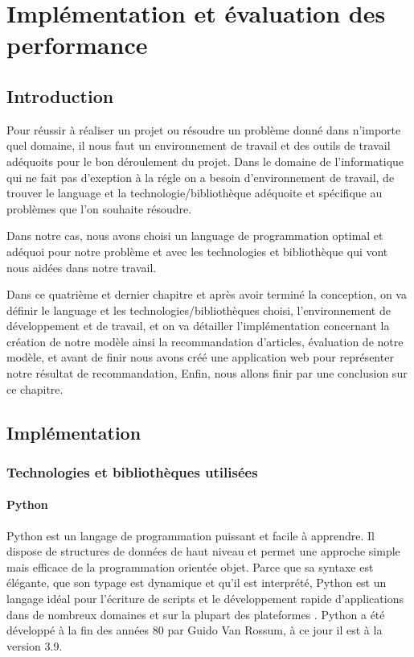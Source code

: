 \chapter{\textbf{Implémentation et évaluation des performance}}\label{chapitre4}

\section{Introduction}
\par Pour réussir à réaliser un projet ou résoudre un problème donné dans n'importe quel domaine, il nous faut un environnement de travail et des outils de travail adéquoits pour le bon déroulement du projet. Dans le domaine de l'informatique qui ne fait pas d'exeption à la régle on a besoin d'environnement  de travail, de trouver le language et la technologie/bibliothèque adéquoite et spécifique au problèmes que l'on souhaite résoudre. 

\par Dans notre cas, nous avons choisi un language de programmation optimal et adéquoi pour notre problème et avec les technologies et bibliothèque qui vont nous aidées dans notre travail.

\par Dans ce quatrième et dernier chapitre et après avoir terminé la conception, on va définir le language et les technologies/bibliothèques choisi, l'environnement de développement et de travail, et on va détailler l'implémentation concernant la création de notre modèle ainsi la recommandation d'articles, évaluation de notre modèle, et avant de finir nous avons créé une application web pour représenter notre résultat de recommandation, Enfin, nous allons finir par une conclusion sur ce chapitre.

\section{Implémentation}
\par 
    \subsection{Technologies et bibliothèques utilisées}
    \par
    
        \subsubsection{Python}
        \par Python est un langage de programmation puissant et facile à apprendre. Il dispose de structures de données de haut niveau et permet une approche simple mais efficace de la programmation orientée objet. Parce que sa syntaxe est élégante, que son typage est dynamique et qu’il est interprété, Python est un langage idéal pour l’écriture de scripts et le développement rapide d’applications dans de nombreux domaines et sur la plupart des plateformes \cite{python}.
        Python a été développé à la fin des années 80 par Guido Van Rossum, à ce jour il est à la version 3.9. 
        
